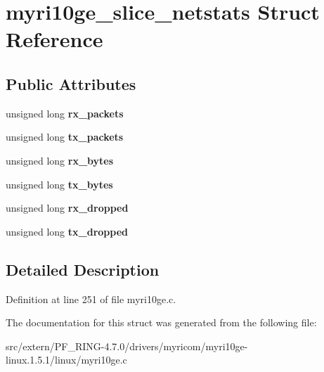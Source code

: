 \hypertarget{structmyri10ge__slice__netstats}{
\section{myri10ge\_\-slice\_\-netstats Struct Reference}
\label{structmyri10ge__slice__netstats}
}
\subsection*{Public Attributes}
\begin{DoxyCompactItemize}
\item 
\hypertarget{structmyri10ge__slice__netstats_a2bf3a51c9061f6bad01199cd70b0c678}{
unsigned long {\bfseries rx\_\-packets}}
\label{structmyri10ge__slice__netstats_a2bf3a51c9061f6bad01199cd70b0c678}

\item 
\hypertarget{structmyri10ge__slice__netstats_a2075510109b62512cf68424c4a1bd324}{
unsigned long {\bfseries tx\_\-packets}}
\label{structmyri10ge__slice__netstats_a2075510109b62512cf68424c4a1bd324}

\item 
\hypertarget{structmyri10ge__slice__netstats_a8def48953290051b82c90c65d5652759}{
unsigned long {\bfseries rx\_\-bytes}}
\label{structmyri10ge__slice__netstats_a8def48953290051b82c90c65d5652759}

\item 
\hypertarget{structmyri10ge__slice__netstats_a365e77d18b2b8946b254df68047ced9d}{
unsigned long {\bfseries tx\_\-bytes}}
\label{structmyri10ge__slice__netstats_a365e77d18b2b8946b254df68047ced9d}

\item 
\hypertarget{structmyri10ge__slice__netstats_ad7ef6cdc56c99f4f8fe7218c5a17af45}{
unsigned long {\bfseries rx\_\-dropped}}
\label{structmyri10ge__slice__netstats_ad7ef6cdc56c99f4f8fe7218c5a17af45}

\item 
\hypertarget{structmyri10ge__slice__netstats_a71dd8bec33d11624c9aed4d9bf335dbc}{
unsigned long {\bfseries tx\_\-dropped}}
\label{structmyri10ge__slice__netstats_a71dd8bec33d11624c9aed4d9bf335dbc}

\end{DoxyCompactItemize}


\subsection{Detailed Description}


Definition at line 251 of file myri10ge.c.



The documentation for this struct was generated from the following file:\begin{DoxyCompactItemize}
\item 
src/extern/PF\_\-RING-\/4.7.0/drivers/myricom/myri10ge-\/linux.1.5.1/linux/myri10ge.c\end{DoxyCompactItemize}
